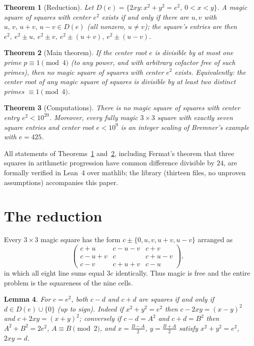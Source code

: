 \documentclass[11pt]{article}
\newtheorem{theorem}{Theorem}
\newtheorem{lemma}[theorem]{Lemma}
\theoremstyle{remark}
\begin{document}
\begin{theorem}[Reduction]\label{thm:reduction}
Let $D(e)=\{2xy : x^2+y^2=e^2,\ 0<x<y\}$.  A magic square of squares with
center $e^2$ exists if and only if there are $u,v$ with
$u,\,v,\,u+v,\,u-v \in D(e)$ (all nonzero, $u\neq v$); the square's entries
are then $e^2,\ e^2\pm u,\ e^2\pm v,\ e^2\pm(u+v),\ e^2\pm(u-v)$.
\end{theorem}

\begin{theorem}[Main theorem]\label{thm:main}
If the center root $e$ is divisible by at most one prime $p\equiv 1\pmod 4$
(to any power, and with arbitrary cofactor free of such primes), then no magic
square of squares with center $e^2$ exists.  Equivalently: the center root of
any magic square of squares is divisible by at least two distinct primes
$\equiv 1 \pmod 4$.
\end{theorem}

\begin{theorem}[Computations]\label{thm:comp}
There is no magic square of squares with center entry $e^2 < 10^{20}$.
Moreover, every fully magic $3\times 3$ square with exactly seven square
entries and center root $e<10^9$ is an integer scaling of Bremner's example
with $e=425$.
\end{theorem}

All statements of Theorems~\ref{thm:reduction} and~\ref{thm:main}, including
Fermat's theorem that three squares in arithmetic progression have common
difference divisible by $24$, are formally verified in Lean~4 over
mathlib; the library (thirteen files, no unproven assumptions) accompanies
this paper.

\section{The reduction}

Every $3\times 3$ magic square has the form
$c \pm \{0,u,v,u+v,u-v\}$ arranged as
\[
\begin{pmatrix} c+u & c-u-v & c+v\\ c-u+v & c & c+u-v\\ c-v & c+u+v & c-u
\end{pmatrix},
\]
in which all eight line sums equal $3c$ identically.  Thus magic is free and
the entire problem is the squareness of the nine cells.

\begin{lemma}\label{lem:pair}
For $c=e^2$, both $c-d$ and $c+d$ are squares if and only if $d\in D(e)\cup\{0\}$
(up to sign).  Indeed if $x^2+y^2=e^2$ then $c-2xy=(x-y)^2$ and
$c+2xy=(x+y)^2$; conversely if $c-d=A^2$ and $c+d=B^2$ then $A^2+B^2=2e^2$,
$A\equiv B \pmod 2$, and $x=\tfrac{B-A}2$, $y=\tfrac{B+A}2$ satisfy
$x^2+y^2=e^2$, $2xy=d$.
\end{lemma}
\end{document}

